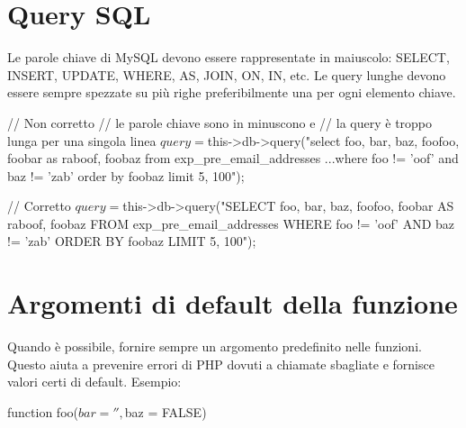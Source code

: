 
\section{Query SQL}
Le parole chiave di MySQL devono essere rappresentate in maiuscolo: SELECT, INSERT, UPDATE, WHERE, AS, JOIN, ON, IN, etc. Le query lunghe devono essere sempre spezzate su più righe preferibilmente una per ogni elemento chiave.

\begin{code}
// Non corretto
// le parole chiave sono in minuscono e
// la query è troppo lunga per una singola linea
$query = $this->db->query("select foo, bar, baz, foofoo, foobar as raboof, foobaz from exp_pre_email_addresses
...where foo != 'oof' and baz != 'zab' order by foobaz limit 5, 100");

// Corretto
$query = $this->db->query("SELECT foo, bar, baz, foofoo, foobar AS raboof, foobaz
				FROM exp_pre_email_addresses
				WHERE foo != 'oof'
				AND baz != 'zab'
				ORDER BY foobaz
				LIMIT 5, 100");
\end{code}

\section*{Argomenti di default della funzione}
Quando è possibile, fornire sempre un argomento predefinito nelle funzioni. Questo aiuta a prevenire errori di \ac{PHP} dovuti a chiamate sbagliate e fornisce valori certi di default. Esempio:

\begin{code}
function foo($bar = '', $baz = FALSE)
\end{code}